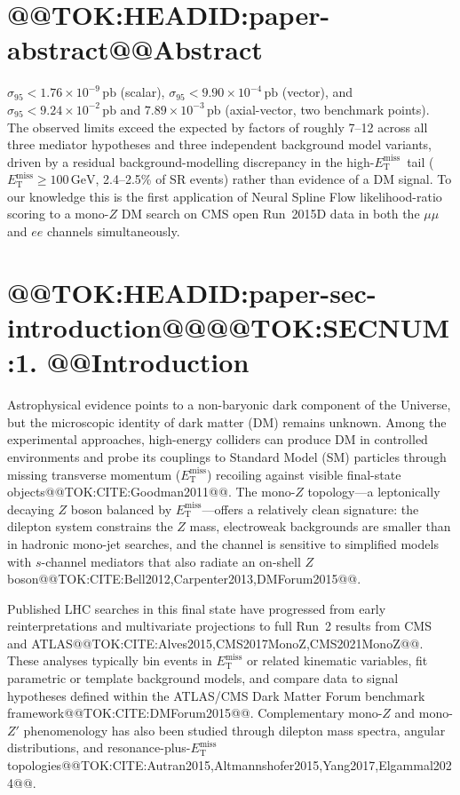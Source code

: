 \documentclass[11pt]{article}
\makeatletter
\newcommand{\GeV}{\text{GeV}}
\newcommand{\MET}{\ensuremath{E_{\mathrm{T}}^{\mathrm{miss}}}}
\newenvironment{abstract}{\section*{@@TOK:HEADID:paper-abstract@@Abstract}}{}
\makeatother
\begin{document}
\begin{abstract}
  $\sigma_{95}<1.76\times10^{-9}\,\mathrm{pb}$ (scalar),
  $\sigma_{95}<9.90\times10^{-4}\,\mathrm{pb}$ (vector), and
  $\sigma_{95}<9.24\times10^{-2}\,\mathrm{pb}$ and
  $7.89\times10^{-3}\,\mathrm{pb}$ (axial-vector, two benchmark points).
  The observed limits exceed the expected by factors of roughly 7--12 across all
  three mediator hypotheses and three independent background model
  variants, driven by a residual background-modelling discrepancy in
  the high-\MET\ tail ($\MET\ge100\,\GeV$, 2.4--2.5\% of SR events)
  rather than evidence of a DM signal.
  To our knowledge this is the first application of Neural Spline Flow
  likelihood-ratio scoring to a mono-$Z$ DM search on CMS open Run~2015D data
  in both the $\mu\mu$ and $ee$ channels simultaneously.
  \end{abstract}

\section{@@TOK:HEADID:paper-sec-introduction@@@@TOK:SECNUM:1. @@Introduction}

Astrophysical evidence points to a non-baryonic dark component of the Universe, but the
microscopic identity of dark matter (DM) remains unknown.
Among the experimental approaches, high-energy colliders can produce DM in controlled
environments and probe its couplings to Standard Model (SM) particles through missing
transverse momentum ($\MET$) recoiling against visible final-state objects@@TOK:CITE:Goodman2011@@.
The mono-$Z$ topology---a leptonically decaying $Z$ boson balanced by $\MET$---offers a
relatively clean signature: the dilepton system constrains the $Z$ mass, electroweak
backgrounds are smaller than in hadronic mono-jet searches, and the channel is sensitive
to simplified models with $s$-channel mediators that also radiate an on-shell $Z$
boson@@TOK:CITE:Bell2012,Carpenter2013,DMForum2015@@.

Published LHC searches in this final state have progressed from early reinterpretations
and multivariate projections to full Run~2 results from CMS and ATLAS@@TOK:CITE:Alves2015,CMS2017MonoZ,CMS2021MonoZ@@.
These analyses typically bin events in $\MET$ or related kinematic variables, fit parametric
or template background models, and compare data to signal hypotheses defined within the
ATLAS/CMS Dark Matter Forum benchmark framework@@TOK:CITE:DMForum2015@@.
Complementary mono-$Z$ and mono-$Z'$ phenomenology has also been studied through dilepton
mass spectra, angular distributions, and resonance-plus-$\MET$ topologies@@TOK:CITE:Autran2015,Altmannshofer2015,Yang2017,Elgammal2024@@.
\end{document}
